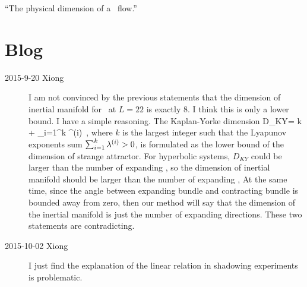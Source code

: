 \documentclass[prl,aps,preprint,showpacs]{revtex4-1} %
\begin{document}
``The physical dimension of a \KS\ flow.''

% 
\fi %

\section{Blog}
\label{sec:blog}

\begin{description}

\item[2015-9-20 Xiong] I am not convinced by the previous
statements that the dimension of inertial manifold for
\KSe\ at $L=22$ is exactly 8. I think this is only a lower bound.
I have a simple reasoning. The Kaplan-Yorke dimension
\beq
    D_{KY}= k +  \sum_{i=1}^k \Lyap^{(i)}
\,,
where $k$ is the largest integer such that the Lyapunov exponents sum
$\sum_{i=1}^k \lambda^{(i)}>0$,
is formulated as the lower bound of the dimension of strange attractor.
For hyperbolic systems,  $D_{KY}$  could be larger than the number of
expanding \cLvs, so the dimension
of inertial manifold should be larger than the number of
expanding \cLvs, At the same time, since the angle
between expanding bundle and contracting bundle is bounded away from
zero, then our method will say that the dimension of the inertial
manifold is just the number of expanding directions. These two
statements are contradicting.

\item[2015-10-02 Xiong] I just find the explanation of the linear
relation in shadowing experiments is problematic.

\end{description}
\end{document}
